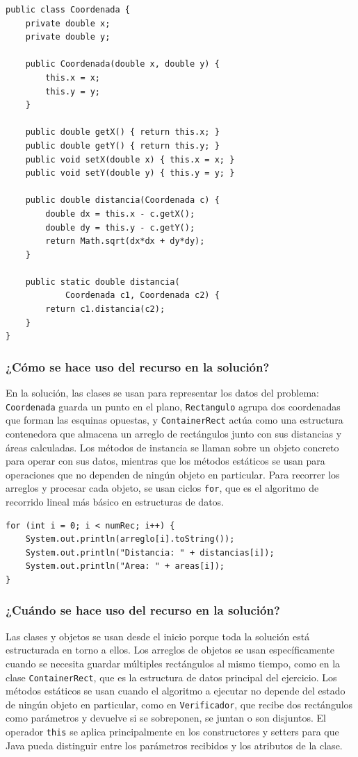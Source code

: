 \documentclass[12pt]{article}
\begin{document}
\begin{verbatim}
public class Coordenada {
    private double x;
    private double y;

    public Coordenada(double x, double y) {
        this.x = x;
        this.y = y;
    }

    public double getX() { return this.x; }
    public double getY() { return this.y; }
    public void setX(double x) { this.x = x; }
    public void setY(double y) { this.y = y; }

    public double distancia(Coordenada c) {
        double dx = this.x - c.getX();
        double dy = this.y - c.getY();
        return Math.sqrt(dx*dx + dy*dy);
    }

    public static double distancia(
            Coordenada c1, Coordenada c2) {
        return c1.distancia(c2);
    }
}
\end{verbatim}

\subsubsection{¿Cómo se hace uso del recurso en la solución?}
En la solución, las clases se usan para representar los datos 
del problema: \texttt{Coordenada} guarda un punto en el plano, 
\texttt{Rectangulo} agrupa dos coordenadas que forman las 
esquinas opuestas, y \texttt{ContainerRect} actúa como una 
estructura contenedora que almacena un arreglo de rectángulos 
junto con sus distancias y áreas calculadas. Los métodos de 
instancia se llaman sobre un objeto concreto para operar con 
sus datos, mientras que los métodos estáticos se usan para 
operaciones que no dependen de ningún objeto en particular. 
Para recorrer los arreglos y procesar cada objeto, se usan 
ciclos \texttt{for}, que es el algoritmo de recorrido lineal 
más básico en estructuras de datos.

\begin{verbatim}
for (int i = 0; i < numRec; i++) {
    System.out.println(arreglo[i].toString());
    System.out.println("Distancia: " + distancias[i]);
    System.out.println("Area: " + areas[i]);
}
\end{verbatim}

\subsubsection{¿Cuándo se hace uso del recurso en la solución?}
Las clases y objetos se usan desde el inicio porque toda la 
solución está estructurada en torno a ellos. Los arreglos de 
objetos se usan específicamente cuando se necesita guardar 
múltiples rectángulos al mismo tiempo, como en la clase 
\texttt{ContainerRect}, que es la estructura de datos 
principal del ejercicio. Los métodos estáticos se usan cuando 
el algoritmo a ejecutar no depende del estado de ningún 
objeto en particular, como en \texttt{Verificador}, que 
recibe dos rectángulos como parámetros y devuelve si se 
sobreponen, se juntan o son disjuntos. El operador 
\texttt{this} se aplica principalmente en los constructores 
y setters para que Java pueda distinguir entre los parámetros 
recibidos y los atributos de la clase.
\end{document}

